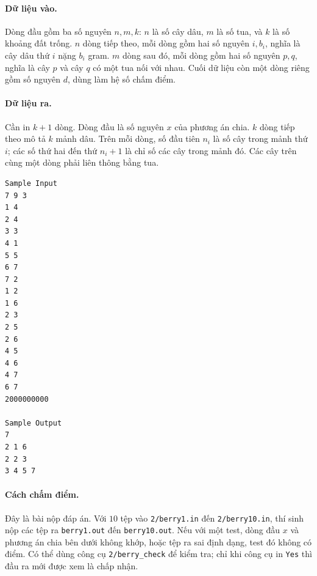 \documentclass[11pt]{article}
\begin{document}
\paragraph{Dữ liệu vào.}
Dòng đầu gồm ba số nguyên \(n,m,k\): \(n\) là số cây dâu, \(m\) là số tua, và
\(k\) là số khoảng đất trống. \(n\) dòng tiếp theo, mỗi dòng gồm hai số nguyên
\(i,b_i\), nghĩa là cây dâu thứ \(i\) nặng \(b_i\) gram. \(m\) dòng sau đó, mỗi
dòng gồm hai số nguyên \(p,q\), nghĩa là cây \(p\) và cây \(q\) có một tua nối
với nhau. Cuối dữ liệu còn một dòng riêng gồm số nguyên \(d\), dùng làm hệ số
chấm điểm.

\paragraph{Dữ liệu ra.}
Cần in \(k+1\) dòng. Dòng đầu là số nguyên \(x\) của phương án chia. \(k\) dòng
tiếp theo mô tả \(k\) mảnh dâu. Trên mỗi dòng, số đầu tiên \(n_i\) là số cây
trong mảnh thứ \(i\); các số thứ hai đến thứ \(n_i+1\) là chỉ số các cây trong
mảnh đó. Các cây trên cùng một dòng phải liên thông bằng tua.

\begin{center}
\end{center}

\begin{verbatim}
Sample Input
7 9 3
1 4
2 4
3 3
4 1
5 5
6 7
7 2
1 2
1 6
2 3
2 5
2 6
4 5
4 6
4 7
6 7
2000000000

Sample Output
7
2 1 6
2 2 3
3 4 5 7
\end{verbatim}

\paragraph{Cách chấm điểm.}
Đây là bài nộp đáp án. Với \(10\) tệp vào
\texttt{2/berry1.in} đến \texttt{2/berry10.in}, thí sinh nộp các tệp ra
\texttt{berry1.out} đến \texttt{berry10.out}. Nếu với một test, dòng đầu \(x\)
và phương án chia bên dưới không khớp, hoặc tệp ra sai định dạng, test đó
không có điểm. Có thể dùng công cụ \texttt{2/berry\_check} để kiểm tra; chỉ
khi công cụ in \texttt{Yes} thì đầu ra mới được xem là chấp nhận.
\end{document}
